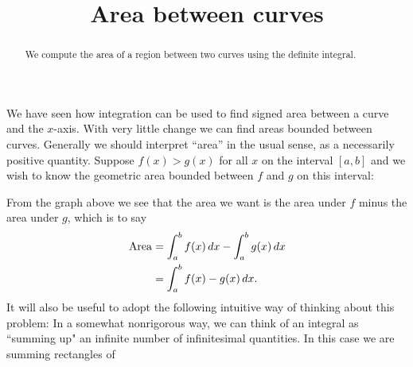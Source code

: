 \documentclass{ximera}
\title[Dig-In:]{Area between curves}
\begin{document}
\begin{abstract}
  We compute the area of a region between two curves using the
  definite integral.
\end{abstract}
\maketitle


We have seen how integration can be used to find signed area between a
curve and the $x$-axis. With very little change we can find areas
bounded between curves.  Generally we should interpret ``area'' in the
usual sense, as a necessarily positive quantity. Suppose $f(x)>g(x)$
for all $x$ on the interval $[a,b]$ and we wish to know the geometric
area bounded between $f$ and $g$ on this interval:
\begin{image}
\end{image}
From the graph above we see that the area we want is the area under
$f$ minus the area under $g$, which is to say
\begin{align*}
\mathrm{Area} &= \int_a^b f(x)\mathop{}\!d x-\int_a^b g(x)\mathop{}\!d x \\
&= \int_a^b f(x)-g(x) \mathop{}\!d x.
\end{align*}
It will also be useful to adopt the following intuitive way of
thinking about this problem: In a somewhat nonrigorous way, we can
think of an integral as ``summing up" an infinite number of
infinitesimal quantities. In this case we are summing rectangles of
\end{document}

